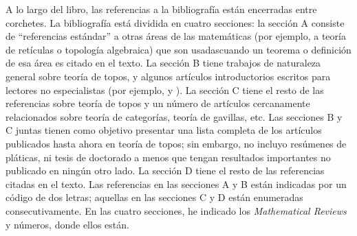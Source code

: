 A lo largo del libro, las referencias a la bibliografía están encerradas entre
corchetes. La bibliografía está dividida en cuatro secciones: la sección A
consiste de \enquote{referencias estándar} a otras áreas de las matemáticas (por
ejemplo, a teoría de retículas o topología algebraica) que son usadascuando un
teorema o definición de esa área es citado en el texto. La sección B tiene
trabajos de naturaleza general sobre teoría de topos, y algunos artículos
introductorios escritos para lectores no especialistas (por ejemplo,
\pend{[BM]} y \pend{[WI]}). La sección C tiene el resto de las referencias sobre
teoría de topos y un número de artículos cercanamente relacionados sobre teoría
de categorías, teoría de gavillas, etc. Las secciones B y C juntas tienen como
objetivo presentar una lista completa de los artículos publicados hasta ahora en
teoría de topos; sin embargo, no incluyo resúmenes de pláticas, ni tesis de
doctorado a menos que tengan resultados importantes no publicado en ningún otro
lado. La sección D tiene el resto de las referencias citadas en el texto. Las
referencias en las secciones A y B están indicadas por un código de dos letras;
aquellas en las secciones C y D están enumeradas consecutivamente. En las cuatro
secciones, he indicado los \textit{Mathematical Reviews} y números, donde ellos
están.